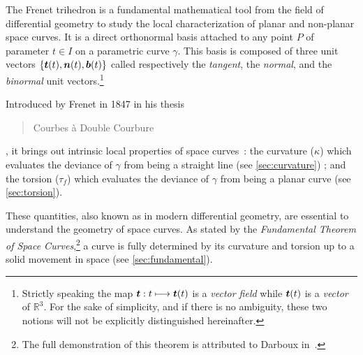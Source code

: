 The Frenet trihedron is a fundamental mathematical tool from the field of differential geometry to study the local characterization of planar and non-planar space curves. It is a direct orthonormal basis attached to any point $P$ of parameter $t \in I$ on a parametric curve $\gamma$. This basis is composed of three unit vectors $\{\boldsymbol{t}(t),\boldsymbol{n}(t),\boldsymbol{b}(t)\}$ called respectively the \emph{tangent}, the \emph{normal}, and the \emph{binormal} unit vectors.\footnote{
Strictly speaking the map $\boldsymbol{t} : t \longmapsto \boldsymbol{t}(t)$ is a \emph{vector field} while $\boldsymbol{t}(t)$ is a \emph{vector} of $\mathbb{R}^3$. For the sake of simplicity, and if there is no ambiguity, these two notions will not be explicitly distinguished hereinafter.}

Introduced by Frenet in 1847 in his thesis \blockcquote[]{Frenet1852}{Courbes à Double Courbure}, it brings out intrinsic local properties of space curves~: the curvature ($\kappa$) which evaluates the deviance of $\gamma$ from being a straight line (see \cref{sec:curvature}) ; and the torsion ($\tau_f$) which evaluates the deviance of $\gamma$ from being a planar curve (see \cref{sec:torsion}).

These quantities, also known as  in modern differential geometry, are essential to understand the geometry of space curves. As stated by the \emph{Fundamental Theorem of Space Curves},\footnote{The full demonstration of this theorem is attributed to Darboux in~\cite[p.11]{Delcourt2007}.} a curve is fully determined by its curvature and torsion up to a solid movement in space (see \cref{sec:fundamental}).

